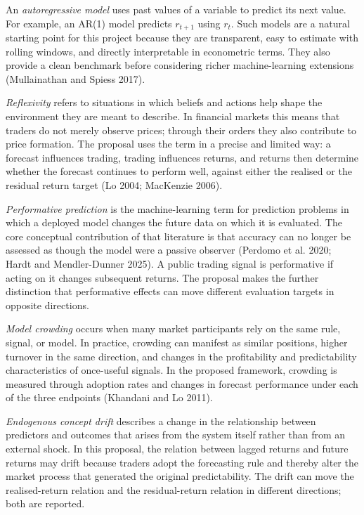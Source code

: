 \documentclass[11pt]{article}
\begin{document}
An \emph{autoregressive model} uses past values of a variable to predict its next value. For example, an AR(1) model predicts $r_{t+1}$ using $r_t$. Such models are a natural starting point for this project because they are transparent, easy to estimate with rolling windows, and directly interpretable in econometric terms. They also provide a clean benchmark before considering richer machine-learning extensions (Mullainathan and Spiess 2017).

\emph{Reflexivity} refers to situations in which beliefs and actions help shape the environment they are meant to describe. In financial markets this means that traders do not merely observe prices; through their orders they also contribute to price formation. The proposal uses the term in a precise and limited way: a forecast influences trading, trading influences returns, and returns then determine whether the forecast continues to perform well, against either the realised or the residual return target (Lo 2004; MacKenzie 2006).

\emph{Performative prediction} is the machine-learning term for prediction problems in which a deployed model changes the future data on which it is evaluated. The core conceptual contribution of that literature is that accuracy can no longer be assessed as though the model were a passive observer (Perdomo et al. 2020; Hardt and Mendler-Dunner 2025). A public trading signal is performative if acting on it changes subsequent returns. The proposal makes the further distinction that performative effects can move different evaluation targets in opposite directions.

\emph{Model crowding} occurs when many market participants rely on the same rule, signal, or model. In practice, crowding can manifest as similar positions, higher turnover in the same direction, and changes in the profitability and predictability characteristics of once-useful signals. In the proposed framework, crowding is measured through adoption rates and changes in forecast performance under each of the three endpoints (Khandani and Lo 2011).

\emph{Endogenous concept drift} describes a change in the relationship between predictors and outcomes that arises from the system itself rather than from an external shock. In this proposal, the relation between lagged returns and future returns may drift because traders adopt the forecasting rule and thereby alter the market process that generated the original predictability. The drift can move the realised-return relation and the residual-return relation in different directions; both are reported.
\end{document}
